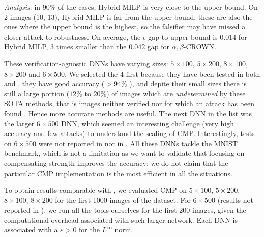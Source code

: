 {\em Analysis}: in 90\% of the cases, Hybrid MILP is very close to the upper bound. On 2 images (10, 13), Hybrid MILP is far from the upper bound: these are also the ones where the upper bound is the highest, so the falsifier may have missed a closer attack to robustness. On average, the $\epsilon$-gap to upper bound is $0.014$ for Hybrid MILP, 3 times smaller than the $0.042$ gap for $\alpha,\beta$-CROWN.


\iffalse

These verification-agnostic DNNs have varying sizes: $5\times 100$, $5\times 200$, $8 \times 100$, $8 \times 200$ and $6 \times 500$. We selected the 4 first because they have been tested in both \cite{prima} and \cite{crown}, they have good accuracy ($>94\%$ \cite{prima}), 
and depite their small sizes there is still a large portion ($12\%$ to $20\%$) of images which are {\em undetermined} by these SOTA methods, that is images neither verified nor for which an attack has been found  \cite{attack}. Hence more accurate methods are useful. 
The next DNN in the list was the larger $6 \times 500$ DNN, which seemed an interesting challenge (very high accuracy and few attacks) to understand the scaling of CMP. Interestingly, tests on $6 \times 500$ were not reported in \cite{prima} nor in \cite{crown}. All these DNNs tackle the MNIST benchmark, which is not a limitation as we want to validate that focusing on compensating strength improves the accuracy: we do not claim that the particular CMP implementation is the most efficient in all the situations.

To obtain results comparable with \cite{prima,crown}, 
we evaluated CMP on $5\times 100$, $5\times 200$, $8 \times 100$, $8 \times 200$ for the first 1000 images of the dataset. For $6\times 500$ (results not reported in \cite{prima,crown}), we run all the tools ourselves for the first 200 images, given the computational overhead associated with such larger network. Each DNN is associated with a $\varepsilon>0$ for the $L^\infty$ norm.

\smallskip

